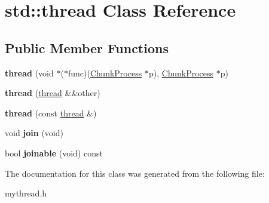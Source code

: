 \hypertarget{classstd_1_1thread}{\section{std\-:\-:thread \-Class \-Reference}
\label{classstd_1_1thread}
}
\subsection*{\-Public \-Member \-Functions}
\begin{DoxyCompactItemize}
\item 
\hypertarget{classstd_1_1thread_a7a0599bdda9dfea79e48a0842626ed0d}{{\bfseries thread} (void $\ast$($\ast$func)(\hyperlink{classChunkProcess}{\-Chunk\-Process} $\ast$p), \hyperlink{classChunkProcess}{\-Chunk\-Process} $\ast$p)}\label{classstd_1_1thread_a7a0599bdda9dfea79e48a0842626ed0d}

\item 
\hypertarget{classstd_1_1thread_a8dde69771312c0d10746295bee36cf5e}{{\bfseries thread} (\hyperlink{classstd_1_1thread}{thread} \&\&other)}\label{classstd_1_1thread_a8dde69771312c0d10746295bee36cf5e}

\item 
\hypertarget{classstd_1_1thread_a3a5b3ae0b855ba2789081f2bd4871d76}{{\bfseries thread} (const \hyperlink{classstd_1_1thread}{thread} \&)}\label{classstd_1_1thread_a3a5b3ae0b855ba2789081f2bd4871d76}

\item 
\hypertarget{classstd_1_1thread_a8b81cf4d21e5f1b354c25bf7f5bfc732}{void {\bfseries join} (void)}\label{classstd_1_1thread_a8b81cf4d21e5f1b354c25bf7f5bfc732}

\item 
\hypertarget{classstd_1_1thread_a68385269c6763275611fae6959d413fc}{bool {\bfseries joinable} (void) const }\label{classstd_1_1thread_a68385269c6763275611fae6959d413fc}

\end{DoxyCompactItemize}


\-The documentation for this class was generated from the following file\-:\begin{DoxyCompactItemize}
\item 
mythread.\-h\end{DoxyCompactItemize}
